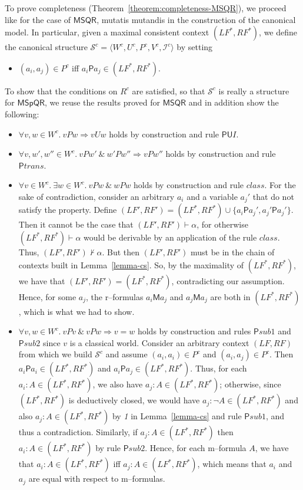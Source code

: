 \documentclass[times, 10pt]{article}
\newcommand{\MSQR}{\textsf{MSQR}}
\newcommand{\MSpQR}{\textsf{MSpQR}}
\newcommand{\Un}{\textsf{U}}
\newcommand{\Me}{\textsf{M}}
\renewcommand{\Un}{\mathsf{U}}
\renewcommand{\Me}{\mathsf{M}}
\newcommand{\PMe}{\mathsf{P}}
\newcommand{\class}{\mathit{class}}
\newcommand{\PMetrans}{\PMe\mathit{trans}}
\newcommand{\PMesubone}{\PMe\mathit{sub1}}
\newcommand{\PMesubtwo}{\PMe\mathit{sub2}}
\newcommand{\LF}{\mathit{LF}}
\newcommand{\RF}{\mathit{RF}}
\newcommand{\I}{\mathscr{I}}
\begin{document}
To prove completeness (Theorem~\ref{theorem:completeness-MSQR}), we proceed like for the case
of $\MSQR$, mutatis mutandis in the construction of the canonical model. In particular, given a 
maximal consistent context $(\LF^*,\RF^*)$, we define the canonical structure
$\mathscr{S}^c = \langle W^c, U^c, P^c, V^c, \I^c \rangle$ by setting 
\begin{itemize}
\item $(a_i,a_j) \in P^c$ iff $a_i \PMe a_j \in (\LF^*,\RF^*)$.
\end{itemize}
To show that the conditions on $R^c$ are satisfied, so that $\mathscr{S}^c$ is really a structure
for $\MSpQR$, we reuse the results proved for $\MSQR$ and in addition show the following:
\begin{itemize}
\item $\forall v, w \in W^c.\ v P w \Longrightarrow v U w$ holds by construction and rule $\PMe\Un I$.

\item $\forall v, w', w'' \in W^c.\ v P w' \ \& \ w' P w'' \Longrightarrow v P w''$ holds by construction 
and rule $\PMetrans$.

\item $\forall v \in W^c.\ \exists w \in W^c.\ v P w \ \& \ w P w$ holds by construction and rule 
$\class$. For the sake of contradiction, consider an arbitrary $a_i$ and a variable $a_j'$ 
that do not satisfy the property. Define $(\LF',\RF') = (\LF^*,\RF^*) \cup \{a_i \PMe a_j', a_j' \PMe a_j'\}$. 
Then it cannot be the case that $(\LF',\RF') \vdash \alpha$, for otherwise $(\LF^*,
\RF^*) \vdash \alpha$ would be derivable by an application of the rule $\class$. Thus, 
$(\LF',\RF') \nvdash \alpha$. But then $(\LF',\RF')$ must be in the chain of contexts built in 
Lemma~\ref{lemma-cs}. So, by the maximality of $(\LF^*,\RF^*)$, we have that 
$(\LF',\RF') = (\LF^*,\RF^*)$, contradicting our assumption. Hence, for some $a_j$, the r--formulas 
$a_i \Me a_j$ and $a_j \Me a_j$ are both in $(\LF^*,\RF^*)$, which is what we had to show.

\item $\forall v, w \in W^c.\ v P v \ \& \ v P w \Longrightarrow v=w$  holds by construction and
rules $\PMesubone$ and $\PMesubtwo$ since $v$ is a classical world.
Consider an arbitrary context $(\LF,\RF)$ from which we build $\mathscr{S}^c$ and assume
$(a_i,a_i) \in P^c$ and $(a_i,a_j) \in P^c$. Then $a_i \PMe a_i \in (\LF^*,\RF^*)$ and 
$a_i \PMe a_j \in (\LF^*,\RF^*)$. Thus, for each $a_i:A \in (\LF^*,\RF^*)$, we also have 
$a_j:A \in (\LF^*,\RF^*)$; otherwise, since $(\LF^*,\RF^*)$ is deductively closed, we would have 
$a_j: \neg A \in (\LF^*,\RF^*)$ and also $a_j: A \in (\LF^*,\RF^*)$ by \emph{1} in 
Lemma~\ref{lemma-cs} and rule $\PMesubone$, and thus a contradiction. Similarly, if 
$a_j:A \in (\LF^*,\RF^*)$ then $a_i:A \in (\LF^*,\RF^*)$ by rule $\PMesubtwo$. Hence, for each 
m--formula $A$, we have that $a_i:A \in (\LF^*,\RF^*)$ iff $a_j:A \in (\LF^*,\RF^*)$, which
means that $a_i$ and $a_j$ are equal with respect to m--formulas. 


\end{itemize}
\end{document}
